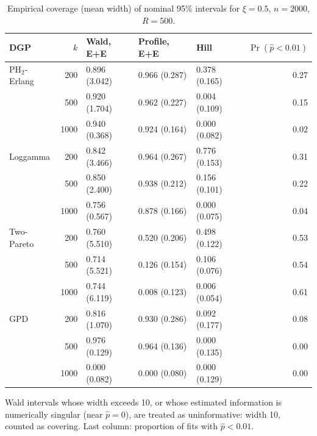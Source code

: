 \begin{table}[t]
\centering
\footnotesize
\setlength{\tabcolsep}{4pt}
\caption{Empirical coverage (mean width) of nominal 95\% intervals for $\xi=0.5$, $n=2000$, $R=500$.}
\label{tab:cov}
\begin{tabular}{lrlllr}
\toprule
DGP & $k$ & Wald, E+E & Profile, E+E & Hill & $\Pr(\hat p<0.01)$ \\
\midrule
PH$_2$-Erlang & 200 & 0.896 (3.042) & 0.966 (0.287) & 0.378 (0.165) & 0.27 \\
 & 500 & 0.920 (1.704) & 0.962 (0.227) & 0.004 (0.109) & 0.15 \\
 & 1000 & 0.940 (0.368) & 0.924 (0.164) & 0.000 (0.082) & 0.02 \\
\midrule
Loggamma & 200 & 0.842 (3.466) & 0.964 (0.267) & 0.776 (0.153) & 0.31 \\
 & 500 & 0.850 (2.400) & 0.938 (0.212) & 0.156 (0.101) & 0.22 \\
 & 1000 & 0.756 (0.567) & 0.878 (0.166) & 0.000 (0.075) & 0.04 \\
\midrule
Two-Pareto & 200 & 0.760 (5.510) & 0.520 (0.206) & 0.498 (0.122) & 0.53 \\
 & 500 & 0.714 (5.521) & 0.126 (0.154) & 0.106 (0.076) & 0.54 \\
 & 1000 & 0.744 (6.119) & 0.008 (0.123) & 0.006 (0.054) & 0.61 \\
\midrule
GPD & 200 & 0.816 (1.070) & 0.930 (0.286) & 0.092 (0.177) & 0.08 \\
 & 500 & 0.976 (0.129) & 0.964 (0.136) & 0.000 (0.135) & 0.00 \\
 & 1000 & 0.000 (0.082) & 0.000 (0.080) & 0.000 (0.129) & 0.00 \\
\bottomrule
\end{tabular}
\par\smallskip
\parbox{\linewidth}{\footnotesize Wald intervals whose width exceeds 10, or whose estimated information is numerically singular (near $\hat p=0$), are treated as uninformative: width 10, counted as covering. Last column: proportion of fits with $\hat p<0.01$.}
\end{table}
